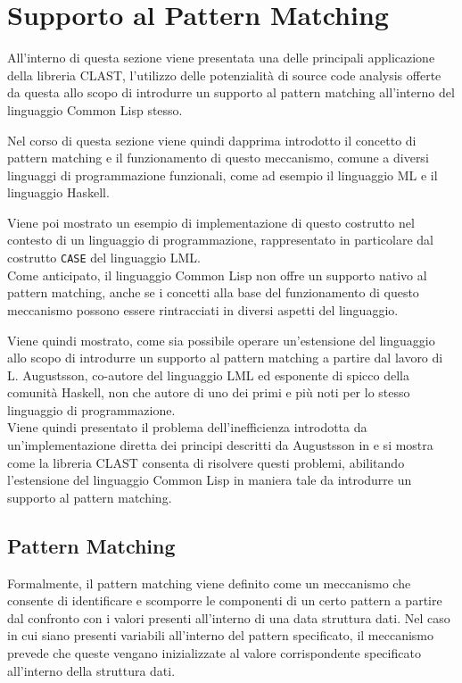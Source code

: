 \section{Supporto al Pattern Matching}
\label{pattern-matching}

All'interno di questa sezione viene presentata una delle principali applicazione
della libreria CLAST, l'utilizzo delle potenzialità di source code analysis
offerte da questa allo scopo di introdurre un supporto al pattern matching
all'interno del linguaggio Common Lisp stesso.

Nel corso di questa sezione viene quindi dapprima introdotto il concetto di
pattern matching e il funzionamento di questo meccanismo, comune a diversi
linguaggi di programmazione funzionali, come ad esempio il linguaggio ML e il
linguaggio Haskell.

Viene poi mostrato un esempio di implementazione di questo costrutto nel
contesto di un linguaggio di programmazione, rappresentato in particolare dal
costrutto \texttt{CASE} del linguaggio LML.\\

Come anticipato, il linguaggio Common Lisp non offre un supporto nativo al
pattern matching, anche se i concetti alla base del funzionamento di questo
meccanismo possono essere rintracciati in diversi aspetti del linguaggio.

Viene quindi mostrato, come sia possibile operare un'estensione del linguaggio
allo scopo di introdurre un supporto al pattern matching a partire dal lavoro di
L. Augustsson, co-autore del linguaggio LML ed esponente di spicco della
comunità Haskell, non che autore di uno dei primi e più noti per lo stesso
linguaggio di programmazione.\\

Viene quindi presentato il problema dell'inefficienza introdotta da
un'implementazione diretta dei principi descritti da Augustsson in \cite{} e si
mostra come la libreria CLAST consenta di risolvere questi problemi, abilitando
l'estensione del linguaggio Common Lisp in maniera tale da introdurre un
supporto al pattern matching.

\subsection{Pattern Matching}

Formalmente, il pattern matching viene definito come un meccanismo che consente
di identificare e scomporre le componenti di un certo pattern a partire dal
confronto con i valori presenti all’interno di una data struttura dati. Nel caso
in cui siano presenti variabili all’interno del pattern specificato, il
meccanismo prevede che queste vengano inizializzate al valore corrispondente
specificato all’interno della struttura dati.\\

